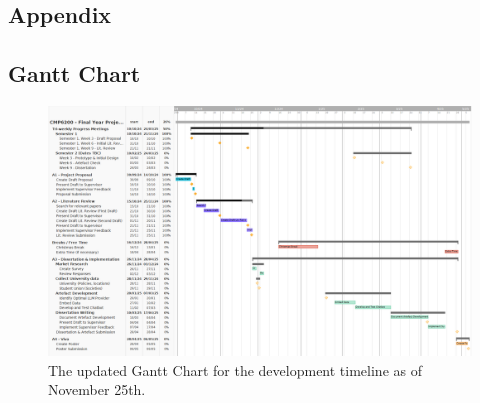 \documentclass[12pt]{report}
\begin{document}
    \begin{landscape}

    \chapter{Appendix}

    \section{Gantt Chart}

    \begin{figure}[H]
        \centering
        \includegraphics[width=.9\linewidth]{LitReviewGantt2.png}
        \caption{The updated Gantt Chart for the development timeline as of November 25th.}
        \label{fig:gantt}
    \end{figure}

    \end{landscape}

    \printbibliography[keyword={refs}, title = {References}]

    \nocite{IBMAIDef}
    \nocite{UXDict}
    \nocite{ICOAIDef}
    \nocite{IBMGenAI}
    \nocite{MITGenAI}
    \nocite{CloudflareLLM}
    \nocite{IBMNLP}
    \nocite{aws_what_nodate}
    \nocite{databricks_retrieval_2023}
    \nocite{elastic_what_nodate}
    \nocite{confident_ai_llm_nodate}

    \printbibliography[keyword={bib}, title = {Bibliography~~~~~~~~~~~~\small{Sources consulted but not directly cited}}]
\end{document}
